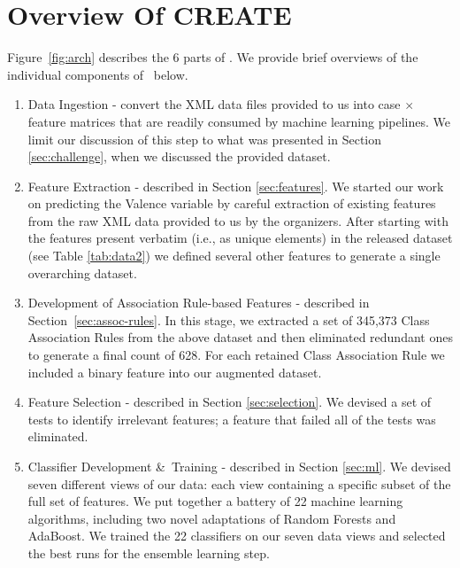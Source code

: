 \chapter{Overview Of CREATE}\label{sec:overview}
Figure~\ref{fig:arch} describes the 6 parts of \CREATE.
We provide brief overviews of the individual components of \CREATE\  below.


\begin{enumerate}
\item \textsf{Data Ingestion} - convert the XML data files provided to us into case $\times$ feature matrices that are readily consumed by machine learning pipelines. We limit our discussion of this step to what was presented in Section \ref{sec:challenge}, when we discussed the provided dataset.

 \item \textsf{Feature Extraction} - described in Section \ref{sec:features}.  We started our work on predicting the \textsf{Valence} variable by careful
extraction of existing features from the raw XML data provided to us by the  organizers.
After starting with the features present verbatim (i.e., as unique elements) in the released dataset (see Table \ref{tab:data2}) we defined several other features to generate a single overarching dataset.

 \item \textsf{Development of Association Rule-based Features} - described in Section~\ref{sec:assoc-rules}. In this stage, we extracted a set of 345,373 Class Association Rules from the above dataset and then eliminated redundant ones to generate a final count of 628. For each retained Class Association Rule we included a binary feature into our augmented dataset.
 
 \item \textsf{Feature Selection} - described in Section \ref{sec:selection}. We devised a set of tests to identify irrelevant features; a feature that failed all of the tests was eliminated.
 
 \item \textsf{Classifier Development \&\ Training} - described in Section \ref{sec:ml}. 
We devised seven different views of our data: each view containing a specific subset of the
full set of features. We put together a battery of 22 machine learning algorithms,
including two novel adaptations of Random Forests and AdaBoost. 
We trained the 22 classifiers on our seven data views and selected the best runs
for the ensemble learning step.


\end{enumerate}

